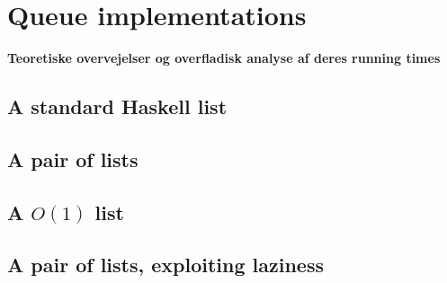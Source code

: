 \section*{Queue implementations}
\textbf{Teoretiske overvejelser og overfladisk analyse af deres running times}

\subsection*{A standard Haskell list}
\subsection*{A pair of lists}
\subsection*{A $O(1)$ list}
\subsection*{A pair of lists, exploiting laziness}